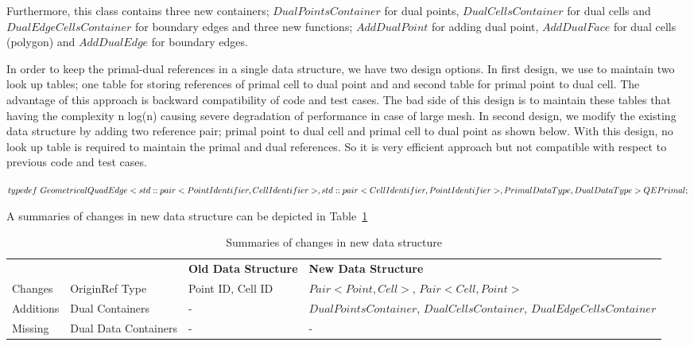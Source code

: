 \documentclass{InsightArticle}
\begin{document}
Furthermore, this class contains three new containers; $DualPointsContainer$ for dual points, $DualCellsContainer$ for dual cells and $DualEdgeCellsContainer$ for boundary edges and three new functions; $AddDualPoint$ for adding dual point, $AddDualFace$ for dual cells (polygon) and $AddDualEdge$ for boundary edges. 

In order to keep the primal-dual references in a single data structure, we have two design options. In first design, we use to maintain two look up tables; one table for storing references of primal cell to dual point and and second table for primal point to dual cell. The advantage of this approach is backward compatibility of code and test cases. The bad side of this design is to maintain these tables that having the complexity n log(n) causing severe degradation of performance in case of large mesh. In second design, we modify the existing data structure by adding two reference pair; primal point to dual cell and primal cell to dual point as shown below. With this design, no look up table is required to maintain the primal and dual references. So it is very efficient approach but not compatible with respect to previous code and test cases. 

$typedef \ GeometricalQuadEdge< \\
    std::pair<PointIdentifier, CellIdentifier>, \\
    std::pair<CellIdentifier,  PointIdentifier>, \\
    PrimalDataType, DualDataType \\
    > QEPrimal;$

A summaries of changes in new data structure can be depicted in Table~\ref{table:secondDesign}

\begin{table}
	\begin{center}
		\caption{Summaries of changes in new data structure}
		\label{table:secondDesign}
		\begin{tabular}{ p{1.3cm} p{3.5cm} p{3.7cm} p{3.7cm} }
			\hline	
			\noalign{\smallskip} 
			{\bf  }	& {\bf } 	& {\bf Old Data Structure}	& {\bf New Data Structure}\\
			\noalign{\smallskip}	
			\hline  	
			\noalign{\smallskip}
			Changes & OriginRef Type & Point ID, Cell ID & $Pair<Point, Cell>$, $Pair<Cell, Point>$\\ 
			Additions & Dual Containers & - & $DualPointsContainer$, $DualCellsContainer$, $DualEdgeCellsContainer$\\
			Missing & Dual Data Containers & - & -\\
			\hline
	\end{tabular}
	\end{center}
\end{table}
\end{document}
